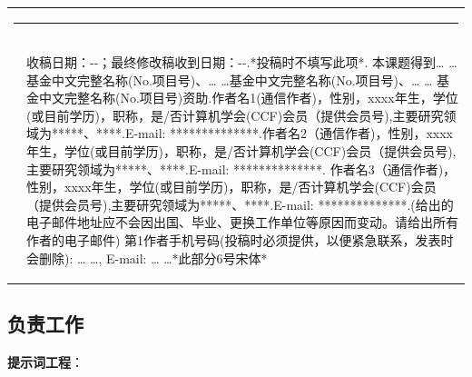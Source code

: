 \documentclass[10.5pt,compsoc]{CjC}
\theoremstyle{mystyle}
\begin{document}
\begin{table}[!t]
\setlength{\tabcolsep}{2pt}
\begin{tabular}{p{0.05cm}p{16.15cm}}
\multicolumn{2}{l}{\rule[4mm]{40mm}{0.1mm}}\\[-3mm]
&\begin{CJK*}{UTF8}{song}
收稿日期：\quad \quad -\quad -\quad ；最终修改稿收到日期：\quad \quad -\quad -\quad .*投稿时不填写此项*. 本课题得到… …基金中文完整名称(No.项目号)、… …基金中文完整名称(No.项目号)、… … 基金中文完整名称(No.项目号)资助.作者名1(通信作者)，性别，xxxx年生，学位(或目前学历)，职称，是/否计算机学会(CCF)会员（提供会员号),主要研究领域为*****、****.E-mail: **************.作者名2（通信作者)，性别，xxxx年生，学位(或目前学历)，职称，是/否计算机学会(CCF)会员（提供会员号),主要研究领域为*****、****.E-mail: **************. 作者名3（通信作者)，性别，xxxx年生，学位(或目前学历)，职称，是/否计算机学会(CCF)会员（提供会员号),主要研究领域为*****、****.E-mail: **************.(给出的电子邮件地址应不会因出国、毕业、更换工作单位等原因而变动。请给出所有作者的电子邮件)
第1作者手机号码(投稿时必须提供，以便紧急联系，发表时会删除): … …, E-mail: … …*此部分6号宋体*
\end{CJK*}
\end{tabular}\end{table}
\clearpage\clearpage
\begin{strip}
\vspace {-13mm}
\end{strip}
    \linespread{1.15}
    \begin{CJK*}{UTF8}{zhhei}
\vskip 1mm
\section{负责工作}
\textbf{提示词工程}：
\end{CJK*}
\end{document}
